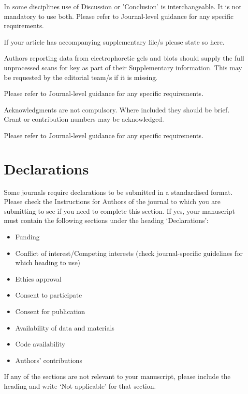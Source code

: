 \documentclass[sn-apa]{sn-jnl}%
\theoremstyle{thmstyleone}%
\theoremstyle{thmstyletwo}%
\theoremstyle{thmstylethree}%
\begin{document}
In some disciplines use of Discussion or 'Conclusion' is interchangeable. It is not mandatory to use both. Please refer to Journal-level guidance for any specific requirements. 

\backmatter


If your article has accompanying supplementary file/s please state so here. 

Authors reporting data from electrophoretic gels and blots should supply the full unprocessed scans for key as part of their Supplementary information. This may be requested by the editorial team/s if it is missing.

Please refer to Journal-level guidance for any specific requirements.


Acknowledgments are not compulsory. Where included they should be brief. Grant or contribution numbers may be acknowledged.

Please refer to Journal-level guidance for any specific requirements.

\section*{Declarations}

Some journals require declarations to be submitted in a standardised format. Please check the Instructions for Authors of the journal to which you are submitting to see if you need to complete this section. If yes, your manuscript must contain the following sections under the heading `Declarations':

\begin{itemize}
\item Funding
\item Conflict of interest/Competing interests (check journal-specific guidelines for which heading to use)
\item Ethics approval 
\item Consent to participate
\item Consent for publication
\item Availability of data and materials
\item Code availability 
\item Authors' contributions
\end{itemize}

\noindent
If any of the sections are not relevant to your manuscript, please include the heading and write `Not applicable' for that section. 
\end{document}
